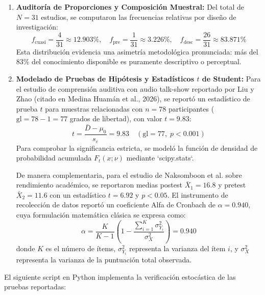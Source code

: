 \begin{enumerate}
    \item \textbf{Auditoría de Proporciones y Composición Muestral:}
    Del total de $N = 31$ estudios, se computaron las frecuencias relativas por diseño de investigación:
    \begin{equation}
    f_{\mathrm{cuasi}} = \frac{4}{31} \approx 12.903\%, \quad f_{\mathrm{pre}} = \frac{1}{31} \approx 3.226\%, \quad f_{\mathrm{desc}} = \frac{26}{31} \approx 83.871\%
    \end{equation}
    Esta distribución evidencia una asimetría metodológica pronunciada: más del 83\% del conocimiento disponible es puramente descriptivo o perceptual.

    \item \textbf{Modelado de Pruebas de Hipótesis y Estadísticos $t$ de Student:}
    Para el estudio de comprensión auditiva con audio talk-show reportado por Liu y Zhao (citado en Medina Huamán et al., 2026), se reportó un estadístico de prueba $t$ para muestras relacionadas con $n = 78$ participantes ($\mathrm{gl} = 78 - 1 = 77$ grados de libertad), con valor $t = 9.83$:
    \begin{equation}
    t = \frac{\bar{D} - \mu_0}{s_e} = 9.83 \quad (\mathrm{gl} = 77, \; p < 0.001)
    \label{eq:t_student_test}
    \end{equation}
    Para comprobar la significancia estricta, se modeló la función de densidad de probabilidad acumulada $F_t(x; \nu)$ mediante `scipy.stats`.
    
    De manera complementaria, para el estudio de Naksomboon et al. sobre rendimiento académico, se reportaron medias postest $\bar{X}_1 = 16.8$ y pretest $\bar{X}_2 = 11.6$ con un estadístico $t = 6.92$ y $p < 0.05$. El instrumento de recolección de datos reportó un coeficiente Alfa de Cronbach de $\alpha = 0.940$, cuya formulación matemática clásica se expresa como:
    \begin{equation}
    \alpha = \frac{K}{K - 1} \left( 1 - \frac{\sum_{i=1}^K \sigma_{Y_i}^2}{\sigma_X^2} \right) = 0.940
    \end{equation}
    donde $K$ es el número de ítems, $\sigma_{Y_i}^2$ representa la varianza del ítem $i$, y $\sigma_X^2$ representa la varianza de la puntuación total observada.
\end{enumerate}

El siguiente script en Python implementa la verificación estocástica de las pruebas reportadas:

